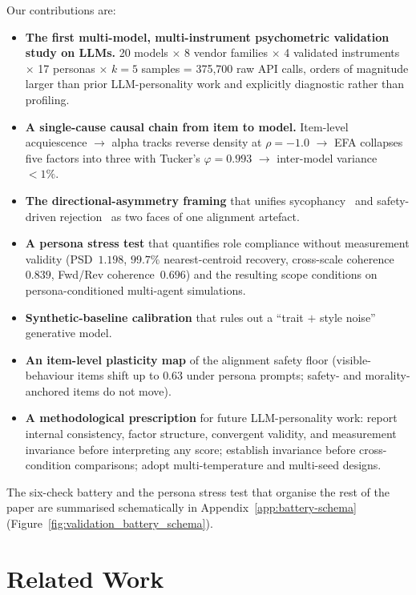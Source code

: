 \documentclass[11pt]{article}
\begin{document}
Our contributions are:
\begin{itemize}\setlength\itemsep{0pt}
  \item \textbf{The first multi-model, multi-instrument psychometric validation study on LLMs.} 20 models $\times$ 8 vendor families $\times$ 4 validated instruments $\times$ 17 personas $\times$ $k=5$ samples = 375{,}700 raw API calls, orders of magnitude larger than prior LLM-personality work and explicitly diagnostic rather than profiling.
  \item \textbf{A single-cause causal chain from item to model.} Item-level acquiescence $\rightarrow$ alpha tracks reverse density at $\rho=-1.0$ $\rightarrow$ EFA collapses five factors into three with Tucker's $\varphi=0.993$ $\rightarrow$ inter-model variance $<1\%$.
  \item \textbf{The directional-asymmetry framing} that unifies sycophancy~\citep{perez2023discovering,sharma2024sycophancy} and safety-driven rejection~\citep{bai2022constitutional} as two faces of one alignment artefact.
  \item \textbf{A persona stress test} that quantifies role compliance without measurement validity (PSD~$1.198$, $99.7\%$ nearest-centroid recovery, cross-scale coherence~$0.839$, Fwd/Rev coherence~$0.696$) and the resulting scope conditions on persona-conditioned multi-agent simulations.
  \item \textbf{Synthetic-baseline calibration} that rules out a ``trait $+$ style noise'' generative model.
  \item \textbf{An item-level plasticity map} of the alignment safety floor (visible-behaviour items shift up to $0.63$ under persona prompts; safety- and morality-anchored items do not move).
  \item \textbf{A methodological prescription} for future LLM-personality work: report internal consistency, factor structure, convergent validity, and measurement invariance before interpreting any score; establish invariance before cross-condition comparisons; adopt multi-temperature and multi-seed designs.
\end{itemize}

\noindent The six-check battery and the persona stress test that organise the rest of the paper are summarised schematically in Appendix~\ref{app:battery-schema} (Figure~\ref{fig:validation_battery_schema}).

\section{Related Work}
\label{sec:related}
\end{document}
